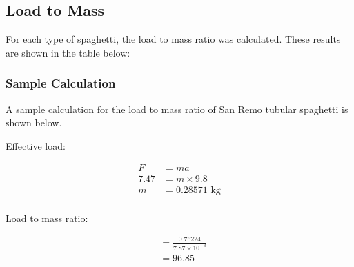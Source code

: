 \documentclass[a4paper,11pt]{article}
\begin{document}
\subsection{Load to Mass}

For each type of spaghetti, the load to mass ratio was calculated. These results
are shown in the table below:

\begin{center}
\end{center}


\subsubsection{Sample Calculation}

A sample calculation for the load to mass ratio of San Remo tubular spaghetti
is shown below.

Effective load:

$$
\begin{aligned}
F & = ma \\
7.47 & = m \times 9.8 \\
m & = 0.28571\mbox{ kg} \\
\end{aligned}
$$

Load to mass ratio:

$$
\begin{aligned}
& = \frac{0.76224}{7.87 \times 10^{-3}} \\
& = 96.85 \\
\end{aligned}
$$
\end{document}
